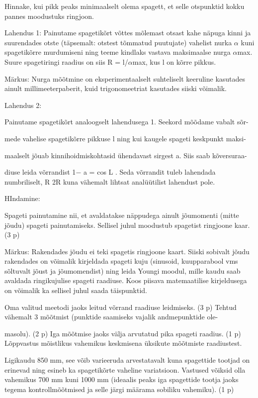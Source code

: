 
Hinnake, kui pikk peaks minimaalselt olema spagett, et selle otspunktid kokku pannes moodustuks ringjoon.

\hint

\solu
Lahendus 1: Painutame spagetikõrt võttes mõlemast otsast kahe näpuga kinni ja suurendades otste (täpsemalt: otstest tõmmatud puutujate) vahelist nurka $\alpha$ kuni spagetikõrre murdumiseni ning teeme kindlaks vastava maksimaalse nurga $\alpha$max. Suure spagetiringi raadius on siis R = l/$\alpha$max, kus l on kõrre pikkus.

Märkus: Nurga mõõtmine on eksperimentaalselt suhteliselt keeruline kasutades ainult millimeeterpaberit, kuid trigonomeetriat kasutades siiski võimalik.

Lahendus 2:

Painutame spagetikõrt analoogselt lahendusega 1. Seekord mõõdame vabalt sõr-

mede vahelise spagetikõrre pikkuse l ning kui kaugele spageti keskpunkt maksi-

maalselt jõuab kinnihoidmiskohtasid ühendavast sirgest a. Siis saab kõversuraa-

diuse leida võrrandist 1$-$ a = cos L . Seda võrrandit tuleb lahendada numbriliselt, R 2R kuna vähemalt lihtsat analüütilist lahendust pole.

HIndamine:

Spageti painutamine nii, et avaldatakse näppudega ainult jõumomenti (mitte jõudu) spageti painutamiseks. Sellisel juhul moodustub spagetist ringjoone kaar. (3 p)

Märkus: Rakendades jõudu ei teki spagetis ringjoone kaart. Siiski sobivalt jõudu rakendades on võimalik kirjeldada spageti kuju (sinusoid, kuupparabool vms sõltuvalt jõust ja jõumomendist) ning leida Youngi moodul, mille kaudu saab avaldada ringikujulise spageti raadiuse. Koos piisava matemaatilise kirjeldusega on võimalik ka sellisel juhul saada täispunktid.

Oma valitud meetodi jaoks leitud võrrand raadiuse leidmiseks. (3 p) Tehtud vähemalt 3 mõõtmist (punktide saamiseks vajalik andmepunktide ole-

masolu). (2 p) Iga mõõtmise jaoks välja arvutatud pika spageti raadius. (1 p) Lõppvastus mõistlikus vahemikus keskmisena üksikute mõõtmiste raadiustest.

Ligikaudu 850 mm, see võib varieeruda arvestatavalt kuna spagettide tootjad on erinevad ning esineb ka spagetikõrte vaheline variatsioon. Vastused võiksid olla vahemikus 700 mm kuni 1000 mm (ideaalis peaks iga spagettide tootja jaoks tegema kontrollmõõtmised ja selle järgi määrama sobiliku vahemiku). (1 p)
\probend
